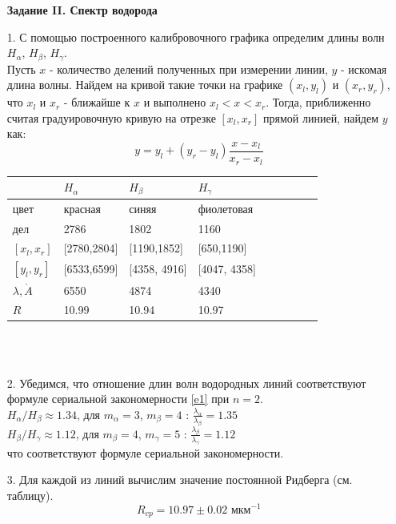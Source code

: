 \documentclass[12pt]{report}
\begin{document}
\begin{enumerate}
\textbf{Задание II. Спектр водорода}

\item[1.] С помощью построенного калибровочного графика определим длины волн $H_\alpha$, $H_\beta$, $H_\gamma$.\\
Пусть $x$ - количество делений полученных при измерении линии, $y$ - искомая длина волны. Найдем на кривой такие точки на графике 
$(x_l,y_l)$ и $(x_r,y_r)$, что $x_l$ и $x_r$ - ближайше к $x$ и выполнено $x_l < x < x_r$. Тогда, приближенно считая градуировочную кривую на отрезке $[x_l,x_r]$ прямой линией, найдем $y$ как:
\begin{equation}
    y = y_l + (y_r - y_l) \frac{x - x_l}{x_r - x_l}
\end{equation}

{
    \centering
    \begin{tabularx}{0.937\textwidth}{|X|X|X|X|X|X|X|X|X|}
        \hline
        & $H_\alpha$ & $H_\beta$ & $H_\gamma$ \\
        \hline
        цвет & красная & синяя & фиолетовая \\
        \hline
        дел & 2786 & 1802 & 1160 \\
        \hline
        $[x_l,x_r]$ & [2780,2804] & [1190,1852] & [650,1190]\\
        \hline
        $[y_l,y_r]$ & [6533,6599] & [4358, 4916] & [4047, 4358]\\
        \hline
        $\lambda, \mathring{A}$ & 6550 & 4874 & 4340 \\
        \hline
        $R$ & 10.99 & 10.94 & 10.97 \\
        \hline
    \end{tabularx}
}
\\
\\

\item[2.] Убедимся, что отношение длин волн водородных линий соответствуют формуле сериальной закономерности \eqref{e1} при $n = 2$. \\
$H_{\alpha}/H_{\beta} \approx 1.34$, для $m_{\alpha} = 3$, $m_{\beta} = 4$ : $\frac{\lambda_{\alpha}}{\lambda_{\beta}} = 1.35$\\
$H_{\beta}/H_{\gamma} \approx 1.12$, для $m_{\beta} = 4$, $m_{\gamma} = 5$ : $\frac{\lambda_{\beta}}{\lambda_{\gamma}} = 1.12$ \\ 
что соответствуют формуле сериальной закономерности.

\item[3.] Для каждой из линий вычислим значение постоянной Ридберга (см. таблицу). \\
$$R_{cp} = 10.97 \pm 0.02 \text{ мкм}^{-1}$$


\end{enumerate}
\end{document}
